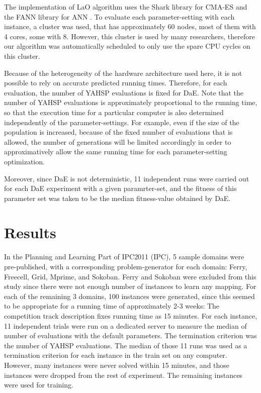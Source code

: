 \documentclass[runningheads,a4paper]{llncs}
\begin{document}
The implementation of LaO algorithm uses the Shark library \cite{shark08} for CMA-ES and the FANN library for ANN \cite{nissen}. To evaluate each parameter-setting with each instance,  a cluster was used, that has approximately 60 nodes, most of them with 4 cores, some with 8. However, this cluster is used by many researchers, therefore our algorithm was automatically scheduled to only use the spare CPU cycles on this cluster.

Because of the heterogeneity of the hardware architecture used here, it is not possible to rely on accurate predicted running times. Therefore, for each evaluation, the number of YAHSP evaluations is fixed for DaE. Note that the number of YAHSP evaluations is approximately proportional to the running time, so that the execution time for a particular computer is also determined independently of the parameter-settings. For example, even if the size of the population is increased, because of the fixed number of evaluations that is allowed, the number of generations will be limited accordingly in order to approximatively allow the same running time for each parameter-setting optimization. 


Moreover, since DaE is not deterministic, 11 independent runs were carried out for each DaE experiment with a given paramrter-set, and the fitness of this parameter set was taken to be the median fitness-value obtained by DaE.

\section{Results}
\label{section:results}

In the Planning and Learning Part of IPC2011 (IPC), 5 sample domains were pre-published, with a corresponding problem-generator for each domain: Ferry, Freecell, Grid, Mprime, and Sokoban. Ferry and Sokoban were excluded from this study since there were not enough number of instances to learn any mapping. For each of the remaining 3 domains, 100 instances were generated, since this seemed to be appropriate for a running time of approximately 2-3 weeks: The competition track description fixes running time as 15 minutes. For each instance, 11 independent trials were run on a dedicated server to measure the median of number of evaluations with the default parameters. The termination criterion was the number of YAHSP evaluations. The median of those 11 runs was used as a termination criterion for each instance in the train set on any computer. However, many instances were never solved within 15 minutes, and those instances were dropped from the rest of experiment. The remaining instances were used for training.
\end{document}
